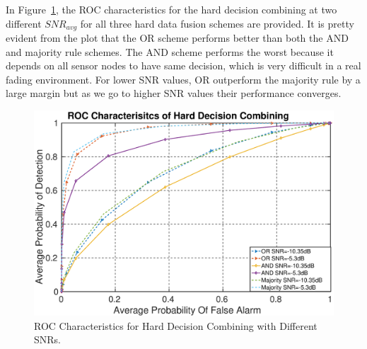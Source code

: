 In Figure~\ref{hardroc}, the ROC characteristics for the hard decision combining at two different $SNR_{avg}$ for all three hard data fusion schemes are provided. It is pretty evident from the plot that the OR scheme performs better than both the AND and majority rule schemes. The AND scheme performs the worst because it depends on all sensor nodes to have same decision, which is very difficult in a real fading environment. For lower SNR values, OR outperform the majority rule by a large margin but as we go to higher SNR values their performance converges.

\begin{figure}[ht!]
	\centering
	\includegraphics[width=\textwidth,keepaspectratio]{images/Gill/figs/hardecisioroc.eps}
    \caption{ROC Characteristics for Hard Decision Combining with Different SNRs.} 
\label{hardroc}      
\end{figure}

